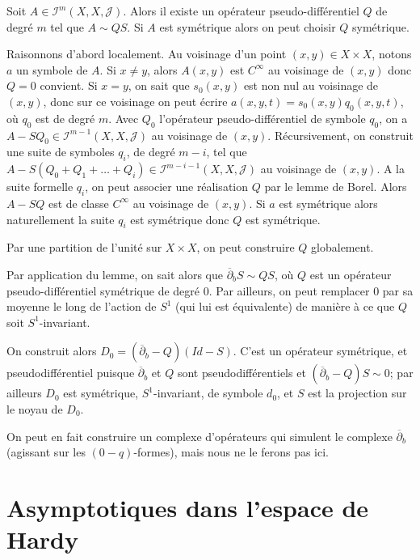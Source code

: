 \begin{lem}
	Soit $A \in \mathcal{I}^m(X,X,\mathcal{J})$. Alors il existe un opérateur pseudo-différentiel $Q$ de degré $m$ tel que $A \sim QS$. Si $A$ est symétrique alors on peut choisir $Q$ symétrique.
\end{lem}
\begin{preuve}
	Raisonnons d'abord localement. Au voisinage d'un point $(x,y) \in X\times X$, notons $a$ un symbole de $A$. Si $x \neq y$, alors $A(x,y)$ est $C^{\infty}$ au voisinage de $(x,y)$ donc $Q=0$ convient. Si $x=y$, on sait que $s_0(x,y)$ est non nul au voisinage de $(x,y)$, donc sur ce voisinage on peut écrire $a(x,y,t)=s_0(x,y)q_0(x,y,t)$, où $q_0$ est de degré $m$. Avec $Q_0$ l'opérateur pseudo-différentiel de symbole $q_0$, on a $A-SQ_0 \in \mathcal{I}^{m-1}(X,X,\mathcal{J})$ au voisinage de $(x,y)$. Récursivement, on construit une suite de symboles $q_i$, de degré $m-i$, tel que $A-S(Q_0+Q_1+\ldots + Q_i) \in \mathcal{I}^{m-i-1}(X,X,\mathcal{J})$ au voisinage de $(x,y)$. A la suite formelle $q_i$, on peut associer une réalisation $Q$ par le lemme de Borel. Alors $A-SQ$ est de classe $C^{\infty}$ au voisinage de $(x,y)$. Si $a$ est symétrique alors naturellement la suite $q_i$ est symétrique donc $Q$ est symétrique.
	
	Par une partition de l'unité sur $X \times X$, on peut construire $Q$ globalement.
\end{preuve}

Par application du lemme, on sait alors que $\overline{\partial}_b S \sim QS$, où $Q$ est un opérateur pseudo-différentiel symétrique de degré $0$. Par ailleurs, on peut remplacer $0$ par sa moyenne le long de l'action de $S^1$ (qui lui est équivalente) de manière à ce que $Q$ soit $S^1$-invariant.

On construit alors $D_0 = (\overline{\partial}_b - Q)(Id-S)$. C'est un opérateur symétrique, et pseudodifférentiel puisque $\overline{\partial}_b$ et $Q$ sont pseudodifférentiels et $(\overline{\partial}_b-Q)S \sim 0$; par ailleurs $D_0$ est symétrique, $S^1$-invariant, de symbole $d_0$, et $S$ est la projection sur le noyau de $D_0$.

On peut en fait construire un complexe d'opérateurs qui simulent le complexe $\overline{\partial}_b$ (agissant sur les $(0-q)$-formes), mais nous ne le ferons pas ici.

\section{Asymptotiques dans l'espace de Hardy}

